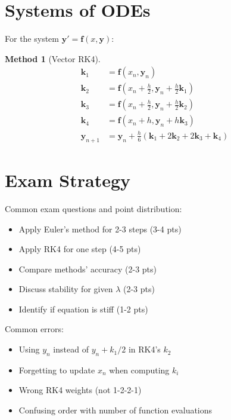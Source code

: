 \documentclass[12pt]{article}
\newtheorem{method}{Method}
\begin{document}
\section{Systems of ODEs}

For the system $\mathbf{y}' = \mathbf{f}(x, \mathbf{y})$:

\begin{method}[Vector RK4]
\begin{align}
\mathbf{k}_{1} &= \mathbf{f}(x_{n}, \mathbf{y}_{n}) \\
\mathbf{k}_{2} &= \mathbf{f}(x_{n} + \frac{h}{2}, \mathbf{y}_{n} + \frac{h}{2}\mathbf{k}_{1}) \\
\mathbf{k}_{3} &= \mathbf{f}(x_{n} + \frac{h}{2}, \mathbf{y}_{n} + \frac{h}{2}\mathbf{k}_{2}) \\
\mathbf{k}_{4} &= \mathbf{f}(x_{n} + h, \mathbf{y}_{n} + h\mathbf{k}_{3}) \\
\mathbf{y}_{n+1} &= \mathbf{y}_{n} + \frac{h}{6}(\mathbf{k}_{1} + 2\mathbf{k}_{2} + 2\mathbf{k}_{3} + \mathbf{k}_{4})
\end{align}
\end{method}

\section{Exam Strategy}

\begin{examtip}
Common exam questions and point distribution:
\begin{itemize}
\item Apply Euler's method for 2-3 steps (3-4 pts)
\item Apply RK4 for one step (4-5 pts)
\item Compare methods' accuracy (2-3 pts)
\item Discuss stability for given $\lambda$ (2-3 pts)
\item Identify if equation is stiff (1-2 pts)
\end{itemize}
\end{examtip}

\begin{warning}
Common errors:
\begin{itemize}
\item Using $y_{n}$ instead of $y_{n} + k_{1}/2$ in RK4's $k_{2}$
\item Forgetting to update $x_{n}$ when computing $k_{i}$
\item Wrong RK4 weights (not 1-2-2-1)
\item Confusing order with number of function evaluations
\end{itemize}
\end{warning}
\end{document}
